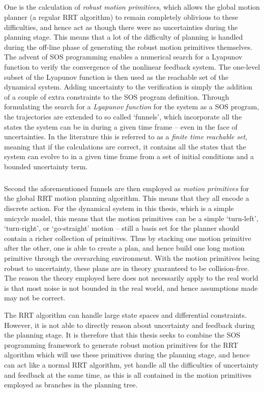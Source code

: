 \subparagraph{} One is the calculation of \textit{robust motion primitives},
which allows the global motion planner (a regular \ac{RRT} algorithm) to remain
completely oblivious to these difficulties, and hence act as though there were
no uncertainties during the planning stage. This means that a lot of the
difficulty of planning is handled during the off-line phase of generating the
robust motion primitives themselves. The advent of \ac{SOS} programming enables
a numerical search for a Lyapunov function to verify the convergence of the
nonlinear feedback system. The one-level subset of the Lyapunov function is then
used as the reachable set of the dynamical system. Adding uncertainty to the
verification is simply the addition of a couple of extra constraints to the
\ac{SOS} program definition. Through formulating the search for a
\textit{Lyapunov function} for the system as a \ac{SOS} program, the
trajectories are extended to so called `funnels', which incorporate all the
states the system can be in during a given time frame -- even in the face of
uncertainties. In the literature this is referred to as a \textit{finite time
  reachable set}, meaning that if the calculations are correct, it contains all
the states that the system can evolve to in a given time frame from a set of
initial conditions and a bounded uncertainty term.


\subparagraph{} Second the aforementioned funnels are then employed as
\textit{motion primitives} for the global \ac{RRT} motion planning algorithm.
This means that they all encode a discrete action. For the dynamical system in
this thesis, which is a simple unicycle model, this means that the motion
primitives can be a simple `turn-left', `turn-right', or `go-straight' motion --
still a basis set for the planner should contain a richer collection of
primitives. Thus by stacking one motion primitive after the other, one is able
to create a plan, and hence build one long motion primitive through the
overarching environment. With the motion primitives being robust to uncertainty,
these plans are in theory guaranteed to be collision-free. The reason the theory
employed here does not necessarily apply to the real world is that most noise is
not bounded in the real world, and hence assumptions made may not be correct.


The \ac{RRT} algorithm can handle large state spaces and differential
constraints. However, it is not able to directly reason about uncertainty and
feedback during the planning stage. It is therefore that this thesis seeks to
combine the \ac{SOS} programming framework to generate robust motion primitives
for the \ac{RRT} algorithm which will use these primitives during the planning
stage, and hence can act like a normal \ac{RRT} algorithm, yet handle all the
difficulties of uncertainty and feedback at the same time, as this is all
contained in the motion primitives employed as branches in the planning tree.

